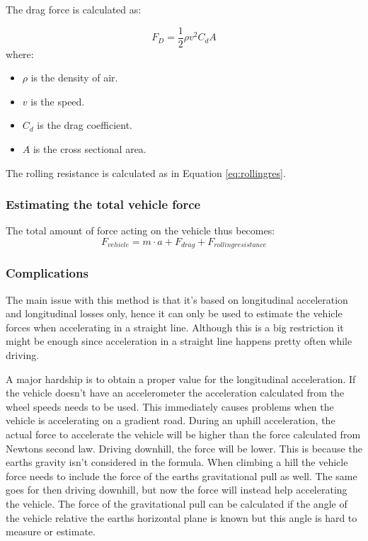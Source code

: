 The drag force is calculated as:

\begin{equation}
F_{D}=\frac{1}{2}\rho v^2 C_{d}A
\end{equation}
where:
\begin{itemize}
	\item $ \rho $ is the density of air.
	\item $ v $ is the speed.
	\item $ C_{d} $ is the drag coefficient.
	\item $ A $ is the cross sectional area.
\end{itemize}
The rolling resistance is calculated as in Equation \ref{eq:rollingres}.

\subsubsection{Estimating the total vehicle force}
The total amount of force acting on the vehicle thus becomes: 
\begin{equation}
\label{eq:newton}
F_{vehicle} = m \cdot a + F_{drag} + F_{rolling resistance}
\end{equation}

\subsubsection{Complications}
The main issue with this method is that it's based on longitudinal acceleration and longitudinal losses only, hence it can only be used to estimate the vehicle forces when accelerating in a straight line. Although this is a big restriction it might be enough since acceleration in a straight line happens pretty often while driving.

A major hardship is to obtain a proper value for the longitudinal acceleration. If the vehicle doesn't have an accelerometer the acceleration calculated from the wheel speeds needs to be used. This immediately causes problems when the vehicle is accelerating on a gradient road. During an uphill acceleration, the actual force to accelerate the vehicle will be higher than the force calculated from Newtons second law. Driving downhill, the force will be lower. This is because the earths gravity isn't considered in the formula. When climbing a hill the vehicle force needs to include the force of the earths gravitational pull as well. The same goes for then driving downhill, but now the force will instead help accelerating the vehicle. The force of the gravitational pull can be calculated if the angle of the vehicle relative the earths horizontal plane is known but this angle is hard to measure or estimate. 

